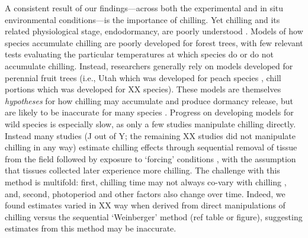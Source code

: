 \documentclass{article}
\begin{document}
\par A consistent result of our findings---across both the experimental and in situ environmental conditions---is the importance of chilling. Yet chilling and its related physiological stage, endodormancy, are poorly understood \citep{chuine2016}. Models of how species accumulate chilling are poorly developed for forest trees, with few relevant tests evaluating the particular temperatures at which species do or do not accumulate chilling. Instead, researchers generally rely on models developed for perennial fruit trees (i.e., Utah which was developed for peach species \citep{richardson1974}, chill portions which was developed for XX species). These models are themselves \emph{hypotheses} for how chilling may accumulate and produce dormancy release, but are likely to be inaccurate for many species \citep{dennis2003}. Progress on developing models for wild species is especially slow, as only a few studies manipulate chilling directly. Instead many studies (J out of Y; the remaining XX studies did not manipulate chilling in any way) estimate chilling effects through sequential removal of tissue from the field followed by exposure to `forcing' conditions \citep{weinberger1950}, with the assumption that tissues collected later experience more chilling. The challenge with this method is multifold: first, chilling time may not always co-vary with chilling \citep{dennis2003}, and, second, photoperiod and other factors also change over time. Indeed, we found estimates varied in XX way when derived from direct manipulations of chilling versus the sequential `Weinberger' method \citep{weinberger1950,polgar2013} (ref table or figure), suggesting estimates from this method may be inaccurate.%
\end{document}
